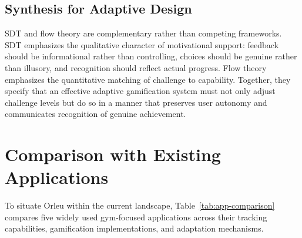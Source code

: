 \documentclass[12pt, a4paper]{report}
\begin{document}
\subsection{Synthesis for Adaptive Design}

SDT and flow theory are complementary rather than competing frameworks. SDT emphasizes the qualitative character of motivational support: feedback should be informational rather than controlling, choices should be genuine rather than illusory, and recognition should reflect actual progress. Flow theory emphasizes the quantitative matching of challenge to capability. Together, they specify that an effective adaptive gamification system must not only adjust challenge levels but do so in a manner that preserves user autonomy and communicates recognition of genuine achievement.

\section{Comparison with Existing Applications}

To situate Orleu within the current landscape, Table~\ref{tab:app-comparison} compares five widely used gym-focused applications across their tracking capabilities, gamification implementations, and adaptation mechanisms.
\end{document}
